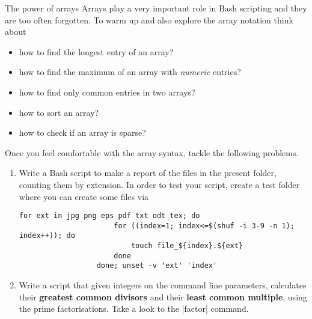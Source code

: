 
\begin{exercise}[Instructive]{The power of arrays}
    Arrays play a very important role in Bash scripting and they are too often forgotten.
    To warm up and also explore the array notation think about
    \begin{itemize}
        \item how to find the longest entry of an array?
        \item how to find the maximum of an array with \emph{numeric} entries?
        \item how to find only common entries in two arrays?
        \item how to sort an array?
        \item how to check if an array is sparse?
    \end{itemize}
    Once you feel comfortable with the array syntax, tackle the following problems.
    \begin{enumerate}[after=\vspace{-\baselineskip}]
        \item Write a Bash script to make a report of the files in the present folder, counting them by extension.
              In order to test your script, create a test folder where you can create some files via
              \begin{lstlisting}[style=MyBash, emph={[2]ext, index}, alsoletter={0123456789![]/\{\}.:}]
                  for ext in jpg png eps pdf txt odt tex; do
                      for ((index=1; index<=$(shuf -i 3-9 -n 1); index++)); do
                          touch file_${index}.${ext}
                      done
                  done; unset -v 'ext' 'index'
              \end{lstlisting}
        \item Write a script that given integers on the command line parameters, calculates their \textbf{greatest common divisors} and their \textbf{least common multiple}, using the prime factorisations.
              Take a look to the \bash|factor| command.
    \end{enumerate}
    \bigskip
\end{exercise}
